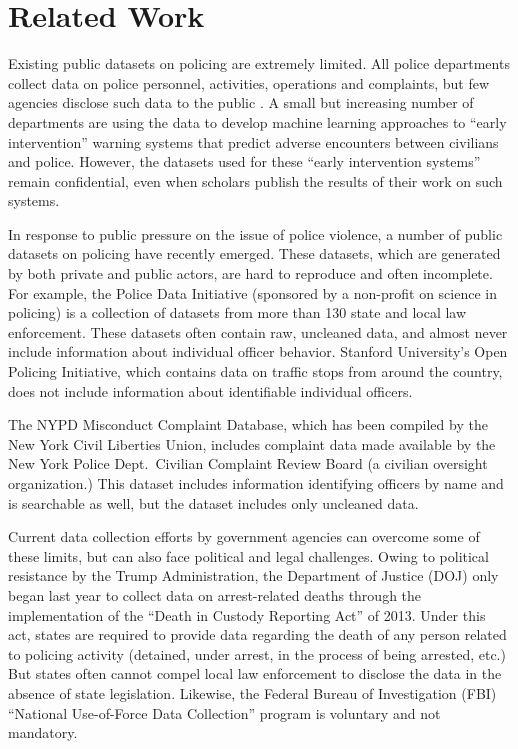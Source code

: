 \section{Related Work}\label{sec:related}

Existing public datasets on policing are extremely limited. All police
departments collect data on police personnel, activities, operations and
complaints, but few agencies disclose such data to the public \cite{Jackman21}.
A small but increasing number of departments are using the data to develop
machine learning approaches to “early intervention” warning systems that
predict adverse encounters between civilians and police. However, the datasets
used for these “early intervention systems” remain confidential, even when
scholars publish the results of their work on such systems.

In response to public pressure on the issue of police violence, a number of
public datasets on policing have recently emerged. These datasets, which are
generated by both private and public actors, are hard to reproduce and often
incomplete. For example, the Police Data Initiative (sponsored by a non-profit
on science in policing) is a collection of datasets from more than 130 state
and local law enforcement. These datasets often contain raw, uncleaned data,
and almost never include information about individual officer behavior.
Stanford University’s Open Policing Initiative, which contains data on traffic
stops from around the country, does not include information about identifiable
individual officers.

The NYPD Misconduct Complaint Database, which has been compiled by the New York
Civil Liberties Union, includes complaint data made available by the New York
Police Dept.\ Civilian Complaint Review Board (a civilian oversight
organization.) This dataset includes information identifying officers by name
and is searchable as well, but the dataset includes only uncleaned data.
 
Current data collection efforts by government agencies can overcome some of
these limits, but can also face political and legal challenges. Owing to
political resistance by the Trump Administration, the Department of Justice
(DOJ) only began last year to collect data on arrest-related deaths through the
implementation of the ``Death in Custody Reporting Act'' of 2013. Under this
act, states are required to provide data regarding the death of any person
related to policing activity (detained, under arrest, in the process of being
arrested, etc.) But states often cannot compel local law enforcement to
disclose the data in the absence of state legislation. Likewise, the Federal
Bureau of Investigation (FBI) ``National Use-of-Force Data Collection'' program
is voluntary and not mandatory.

